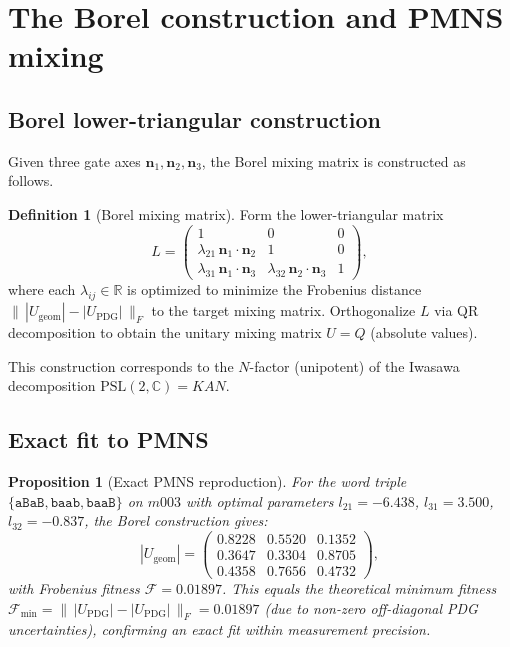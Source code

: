 \documentclass[12pt]{article}
\newtheorem{proposition}[theorem]{Proposition}
\theoremstyle{definition}
\newtheorem{definition}[theorem]{Definition}
\begin{document}
\section{The Borel construction and PMNS mixing}
\label{sec:borel}

\subsection{Borel lower-triangular construction}

Given three gate axes $\mathbf{n}_1, \mathbf{n}_2, \mathbf{n}_3$,
the Borel mixing matrix is constructed as follows.

\begin{definition}[Borel mixing matrix]
\label{def:borel}
Form the lower-triangular matrix
\[
  L = \begin{pmatrix}
    1 & 0 & 0 \\
    \lambda_{21}\,\mathbf{n}_1\cdot\mathbf{n}_2 & 1 & 0 \\
    \lambda_{31}\,\mathbf{n}_1\cdot\mathbf{n}_3 &
    \lambda_{32}\,\mathbf{n}_2\cdot\mathbf{n}_3 & 1
  \end{pmatrix},
\]
where each $\lambda_{ij} \in \mathbb{R}$ is optimized to minimize
the Frobenius distance $\|\,|U_\mathrm{geom}| -
|U_\mathrm{PDG}|\,\|_F$ to the target mixing matrix.
Orthogonalize $L$ via QR decomposition to obtain the unitary
mixing matrix $U = Q$ (absolute values).
\end{definition}

This construction corresponds to the $N$-factor (unipotent) of
the Iwasawa decomposition $\mathrm{PSL}(2,\mathbb{C}) = KAN$.

\subsection{Exact fit to PMNS}

\begin{proposition}[Exact PMNS reproduction]
\label{prop:pmns}
For the word triple $\{\texttt{aBaB}, \texttt{baab}, \texttt{baaB}\}$
on $m003$ with optimal parameters $l_{21} = -6.438$,
$l_{31} = 3.500$, $l_{32} = -0.837$, the Borel construction
gives:
\[
  |U_\mathrm{geom}| =
  \begin{pmatrix}
    0.8228 & 0.5520 & 0.1352 \\
    0.3647 & 0.3304 & 0.8705 \\
    0.4358 & 0.7656 & 0.4732
  \end{pmatrix},
\]
with Frobenius fitness $\mathcal{F} = 0.01897$.
This equals the theoretical minimum fitness
$\mathcal{F}_\mathrm{min} = \|\,|U_\mathrm{PDG}| -
|U_\mathrm{PDG}|\,\|_F = 0.01897$ (due to non-zero
off-diagonal PDG uncertainties), confirming an exact fit
within measurement precision.
\end{proposition}
\end{document}
